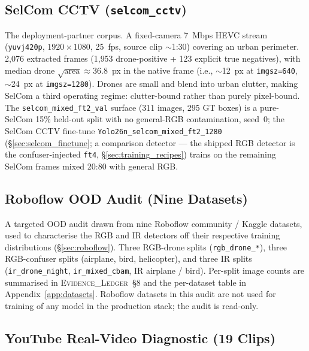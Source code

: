 \documentclass[12pt,a4paper,oneside,openright]{book}
\begin{document}
\subsection{SelCom CCTV (\texttt{selcom\_cctv})}
\label{sec:ds_selcom}

The deployment-partner corpus. A fixed-camera 7~Mbps HEVC stream (\texttt{yuvj420p}, $1920{\times}1080$, 25~fps, source clip $\sim$1:30) covering an urban perimeter. 2{,}076 extracted frames (1{,}953 drone-positive + 123 explicit true negatives), with median drone $\sqrt{\text{area}} \approx 36.8$~px in the native frame (i.e., $\sim$12~px at \texttt{imgsz=640}, $\sim$24~px at \texttt{imgsz=1280}). Drones are small and blend into urban clutter, making SelCom a third operating regime: clutter-bound rather than purely pixel-bound. The \texttt{selcom\_mixed\_ft2\_val} surface (311 images, 295 GT boxes) is a pure-SelCom 15\% held-out split with no general-RGB contamination, seed~0; the SelCom CCTV fine-tune \texttt{Yolo26n\_selcom\_mixed\_ft2\_1280} (\S\ref{sec:selcom_finetune}; a comparison detector --- the shipped RGB detector is the confuser-injected \texttt{ft4}, \S\ref{sec:training_recipes}) trains on the remaining SelCom frames mixed 20:80 with general RGB.

\subsection{Roboflow OOD Audit (Nine Datasets)}
\label{sec:ds_roboflow}

A targeted OOD audit drawn from nine Roboflow community / Kaggle datasets, used to characterise the RGB and IR detectors off their respective training distributions (\S\ref{sec:roboflow}). Three RGB-drone splits (\texttt{rgb\_drone\_*}), three RGB-confuser splits (airplane, bird, helicopter), and three IR splits (\texttt{ir\_drone\_night}, \texttt{ir\_mixed\_cbam}, IR airplane / bird). Per-split image counts are summarised in \textsc{Evidence\_Ledger}~\S8 and the per-dataset table in Appendix~\ref{app:datasets}. Roboflow datasets in this audit are not used for training of any model in the production stack; the audit is read-only.

\subsection{YouTube Real-Video Diagnostic (19 Clips)}
\label{sec:ds_youtube}
\end{document}
